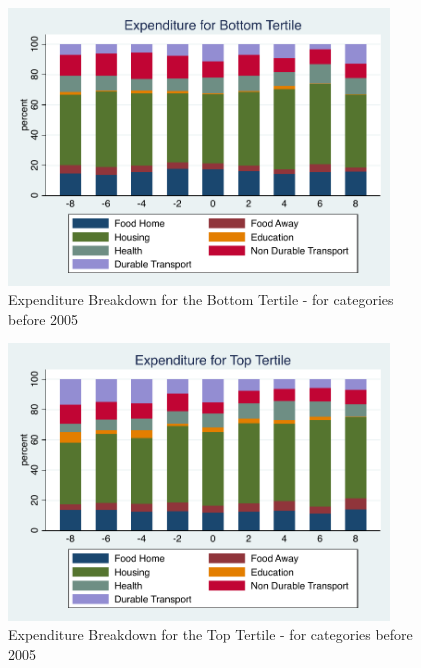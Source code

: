 \documentclass[a4paper]{article}
\begin{document}
\begin{figure}[h]
	\caption{Expenditure Breakdown for the Bottom Tertile - for categories before 2005}
	\centering
	\includegraphics[width=0.9\textwidth]{../ConsumptionPostRetirement/Tertile_Bar/tertile1.pdf}
\end{figure}


\begin{figure}[H]
	\caption{Expenditure Breakdown for the Top Tertile - for categories before 2005}
	\centering
	\includegraphics[width=0.9\textwidth]{../ConsumptionPostRetirement/Tertile_Bar/tertile3.pdf}
\end{figure}
\end{document}
